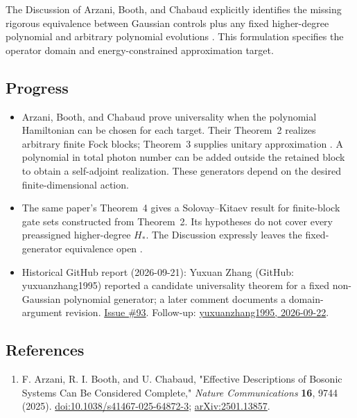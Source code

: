 The Discussion of Arzani, Booth, and Chabaud explicitly identifies the missing rigorous equivalence between Gaussian controls plus any fixed higher-degree polynomial and arbitrary polynomial evolutions .
This formulation specifies the operator domain and energy-constrained approximation target.

\subsection*{Progress}

\begin{itemize}
  \item Arzani, Booth, and Chabaud prove universality when the polynomial Hamiltonian can be chosen for each target.
Their Theorem~2 realizes arbitrary finite Fock blocks; Theorem~3 supplies unitary approximation .
A polynomial in total photon number can be added outside the retained block to obtain a self-adjoint realization.
These generators depend on the desired finite-dimensional action.

  \item The same paper's Theorem~4 gives a Solovay--Kitaev result for finite-block gate sets constructed from Theorem~2.
Its hypotheses do not cover every preassigned higher-degree $H_*$.
The Discussion expressly leaves the fixed-generator equivalence open .

  \item Historical GitHub report (2026-09-21): Yuxuan Zhang (GitHub: yuxuanzhang1995) reported a candidate universality theorem for a fixed non-Gaussian polynomial generator; a later comment documents a domain-argument revision. \href{https://github.com/Naixu-Guo/quantum-open-problems/issues/93}{Issue \#93}. Follow-up: \href{https://github.com/Naixu-Guo/quantum-open-problems/issues/93#issuecomment-5769851164}{yuxuanzhang1995, 2026-09-22}.
\end{itemize}

\subsection*{References}

\begin{enumerate}[label={},leftmargin=4.8em,labelsep=0.5em]
  \footnotesize
  \item[\textup{[ABC25]}]\label{ref:fixed-poly-abc}
  F. Arzani, R. I. Booth, and U. Chabaud, "Effective Descriptions of Bosonic Systems Can Be Considered Complete," \emph{Nature Communications} \textbf{16}, 9744 (2025). \href{https://doi.org/10.1038/s41467-025-64872-3}{doi:10.1038/s41467-025-64872-3}; \href{https://arxiv.org/abs/2501.13857}{arXiv:2501.13857}.
\end{enumerate}

